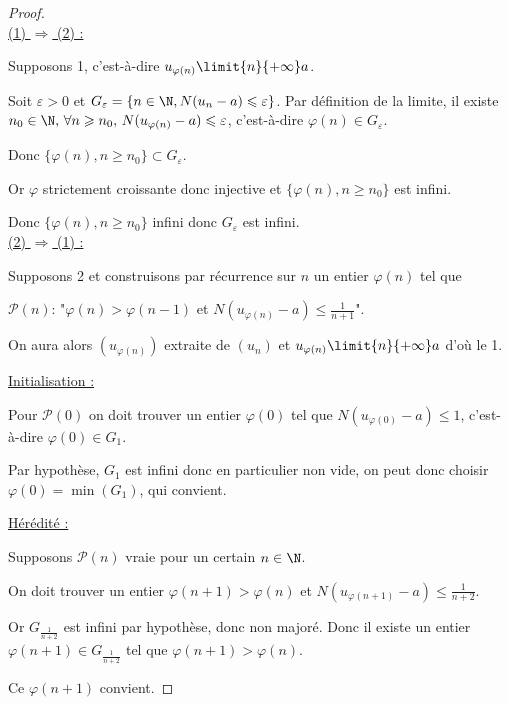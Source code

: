 
\begin{proof}~\\
    \uline{(1) $\Rightarrow$ (2) :}

    Supposons 1, c'est-à-dire $u_{\varphi(n)} \limit{n}{+\infty} a$.

    Soit $\varepsilon > 0$ et $G_\varepsilon = \{n \in \N, N(u_n - a) \leqslant \varepsilon\}$.
    Par définition de la limite, il existe $n_0 \in \N, \, \forall n \geqslant n_0, \, N(u_{\varphi(n)} - a) \leqslant \varepsilon$, 
    c'est-à-dire $\varphi(n) \in G_\varepsilon$.

    Donc $\{\varphi(n), n \geqslant n_0\} \subset G_\varepsilon$.

    Or $\varphi$ strictement croissante donc injective et $\{\varphi(n), n \geqslant n_0\}$ est infini.
    
    Donc $\{\varphi(n), n \geqslant n_0\}$ infini donc $G_\varepsilon$ est infini.\\
    
    \uline{(2) $\Rightarrow$ (1) :}

    Supposons 2 et construisons par récurrence sur $n$ un entier $\varphi(n)$ tel que

    $\mathscr P(n)$: "$\varphi(n) > \varphi(n - 1)$ et $N(u_{\varphi(n)} - a) \leqslant \frac 1 {n + 1}$".

    On aura alors $(u_{\varphi(n)})$ extraite de $(u_n)$ et $u_{\varphi(n)} \limit{n}{+\infty} a$
    d'où le 1. 

    \quad \uline{Initialisation :}

    \svspace Pour $\mathscr P(0)$ on doit trouver un entier $\varphi(0)$ tel que
    $N(u_{\varphi(0)} - a) \leqslant 1$, c'est-à-dire $\varphi(0) \in G_1$.

    Par hypothèse, $G_1$ est infini donc en particulier non vide, on peut donc 
    choisir $\varphi(0)  = \min(G_1)$, qui convient. 

    \quad \uline{Hérédité :}

    \svspace Supposons $\mathscr P(n)$ vraie pour un certain $n \in \N$.

    On doit trouver un entier $\varphi(n+1) > \varphi(n)$ et 
    $N(u_{\varphi(n + 1)} - a) \leqslant \frac 1 {n + 2}$. 

    Or $G_{\frac 1 {n + 2}}$ est infini par hypothèse, donc non majoré. Donc il existe
    un entier $\varphi(n + 1) \in G_{\frac 1 {n + 2}}$ tel que $\varphi(n + 1) > \varphi(n)$.

    Ce $\varphi(n + 1)$ convient.
\end{proof}

